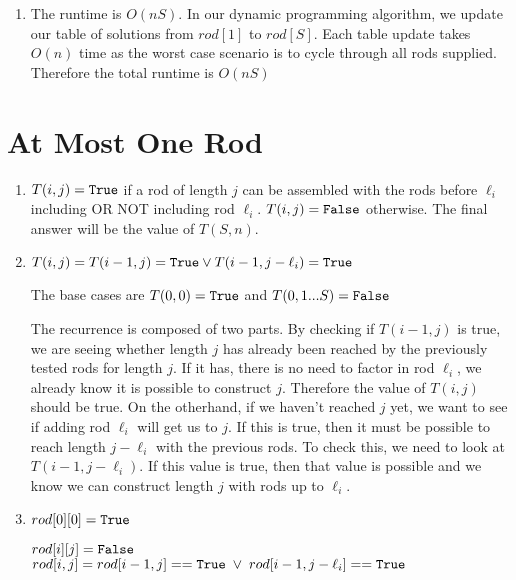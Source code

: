 \documentclass{article}
\begin{document}
\begin{enumerate}
\begin{algorithmic}
            \EndFunction        
        \end{algorithmic}

    \item The runtime is $O(nS)$. In our dynamic programming algorithm, we update our table of solutions from $rod[1]$ to $rod[S]$.
            Each table update takes $O(n)$ time as the worst case scenario is to cycle through all rods supplied. Therefore the total runtime is $O(nS)$
\end{enumerate}

\newpage
\section{At Most One Rod}
\begin{enumerate}
    \item $T(i, j) = \texttt{True}$  if a rod of length $j$ can be assembled with the rods before $\ell_i$ including OR NOT including rod $\ell_i$. 
        $T(i, j) = \texttt{False}$ otherwise. The final answer will be the value of $T(S, n)$.
    
    \item 
        $T(i, j) = T(i-1, j) = \texttt{True} \lor T(i-1, j-\ell_i) = \texttt{True}$

        The base cases are $T(0, 0) = \texttt{True}$ and $T(0, 1...S) = \texttt{False}$

        The recurrence is composed of two parts. By checking if $T(i-1, j)$ is true, we are seeing whether length $j$ has already been reached by the previously tested rods for length $j$.
        If it has, there is no need to factor in rod $\ell_i$, we already know it is possible to construct $j$. Therefore the value of $T(i, j)$ should be true.
        On the otherhand, if we haven't reached $j$ yet, we want to see if adding rod $\ell_i$ will get us to $j$. If this is true, then it must be possible to reach length $j - \ell_i$ with the previous rods.
        To check this, we need to look at $T(i-1, j-\ell_i)$. If this value is true, then that value is possible and we know we can construct length $j$ with rods up to $\ell_i$.
    \item 
        \begin{algorithmic}
                \State $rod[0][0] = \texttt{True}$

                            \State $rod[i][j] = \texttt{False}$
                            \State $rod[i, j] = rod[i-1, j] == \texttt{True} \; \lor \; rod[i-1, j-\ell_i] == \texttt{True}$
                        \EndIf
                    \EndFor
                \EndFor


\end{algorithmic}
\end{enumerate}
\end{document}
